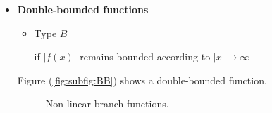 \documentclass[conference,letterpaper,onecolumn,11pt]{IEEEtran}
\begin{document}
\begin{itemize}
\item {\bf Double-bounded functions}\hfill\par
      \begin{itemize}
      \item Type $B$\hfill\par
        if $|f(x)|$ remains bounded according to $|x|\to \infty$
      \end{itemize}

	  Figure (\ref{fig:subfig:BB}) shows a double-bounded function.  

\begin{figure}[hbtp]
\begin{center}
\hspace{0.4in}
\end{center}
\caption{Non-linear branch functions.}
\label{fig:subfig}
\end{figure}      
\end{itemize}
\end{document}

